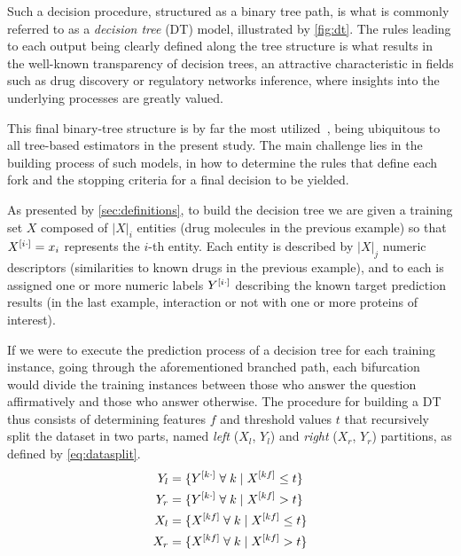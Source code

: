 Such a decision procedure, structured as a binary tree path, is what is commonly referred to as a \emph{decision tree} (DT) model, illustrated by \autoref{fig:dt}. The rules leading to each output being clearly defined along the tree structure is what results in the well-known transparency of decision trees, an attractive characteristic in fields such as drug discovery or regulatory networks inference, where insights into the underlying processes are greatly valued.

This final binary-tree structure is by far the most utilized~\cite{}, being ubiquitous to all tree-based estimators in the present study. The main challenge lies in the building process of such models, in how to determine the rules that define each fork and the stopping criteria for a final decision to be yielded.

As presented by \autoref{sec:definitions}, to build the decision tree we are given a training set $X$ composed of $|X|_i$ entities (drug molecules in the previous example) so that $X^{[i\cdot]} = x_i$ represents the $i$-th entity. Each entity is described by $|X|_j$ numeric descriptors (similarities to known drugs in the previous example), and to each is assigned one or more numeric labels $Y^{[i\cdot]}$ describing the known target prediction results (in the last example, interaction or not with one or more proteins of interest).

If we were to execute the prediction process of a decision tree for each training instance, going through the aforementioned branched path, each bifurcation would divide the training instances between those who answer the question affirmatively and those who answer otherwise.
The procedure for building a DT thus consists of determining features $f$ and threshold values $t$ that recursively split the dataset in two parts, named \emph{left} ($X_l$, $Y_l$) and \emph{right} ($X_r$, $Y_r$) partitions, as defined by \autoref{eq:datasplit}.
%
\begin{equation}
    \begin{split} %
        Y_l &=\{Y\el{k\cdot} \;\forall\; k \mid X\el{kf} \le t\}\\
        Y_r &=\{Y\el{k\cdot} \;\forall\; k \mid X\el{kf} > t\}\\
        X_l &=\{X\el{kf} \;\forall\; k \mid X\el{kf} \le t\}\\
        X_r &=\{X\el{kf} \;\forall\; k \mid X\el{kf} > t\}\\
    \end{split}
    \label{eq:datasplit}
\end{equation}

